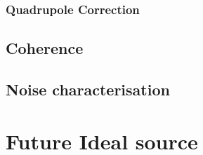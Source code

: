 \subsubsection{Quadrupole Correction}\label{section:quadrupole}

\subsection{Coherence}

\subsection{Noise characterisation}

\section{Future Ideal source}